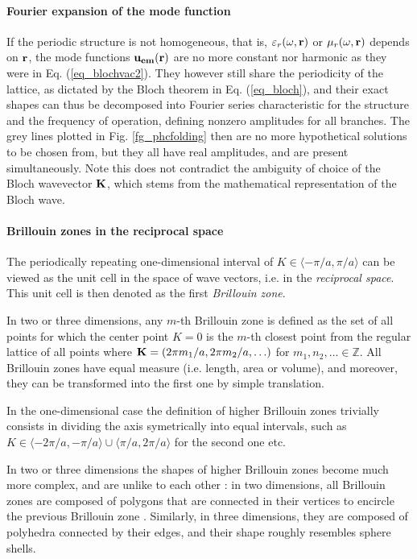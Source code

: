 \paragraph{Fourier expansion of the mode function}%
If the periodic structure is not homogeneous, that is, $\varepsilon_r(\omega,{\mathbf{r}})$ or $\mu_r(\omega,{\mathbf{r}})$ depends on ${\mathbf{r}}$, the mode functions $\mathbf{u_{em}}({\mathbf{r}})$ are no more constant nor harmonic as they were in Eq. (\ref{eq_blochvac2}). They however still share the periodicity of the lattice, as dictated by the Bloch theorem in Eq. (\ref{eq_bloch}), and their exact shapes can thus be decomposed into Fourier series
characteristic for the structure and the frequency of operation, defining nonzero amplitudes for all branches. The grey lines plotted in Fig. \ref{fg_phcfolding} then are no more hypothetical solutions to be chosen from, but they all have real amplitudes, and are present simultaneously. 
Note this does not contradict the ambiguity of choice of the Bloch wavevector ${\mathbf{K}}$, which stems from the  mathematical representation of the Bloch wave.

\paragraph{Brillouin zones in the reciprocal space} %

The periodically repeating one-dimensional interval of $K\in\langle-\pi/a, \pi/a\rangle$ can be viewed as the unit cell in the space of wave vectors, i.e. in the \textit{reciprocal space}. This unit cell is then denoted as the first \textit{Brillouin zone}. 

In two or three dimensions, any $m$-th Brillouin zone is defined as the set of all points for which the center point $K=0$ is the $m$-th closest point from the regular lattice of all points where ${\mathbf{K}} = (2\pi m_1/a, 2\pi m_2/a, \ldots)$ for $m_1, n_2, \ldots \in \mathbb{Z}$.
All Brillouin zones have equal measure (i.e. length, area or volume), and moreover, they can be transformed into the first one by simple translation. %

In the one-dimensional case the definition of higher Brillouin zones trivially consists in dividing the axis symetrically into equal intervals, such as $K\in\langle-2\pi/a, -\pi/a\rangle \cup \langle \pi/a, 2\pi/a\rangle$ for the second one etc. 

In two or three dimensions the shapes of higher Brillouin zones become much more complex, and are unlike to each other \cite[pp. 134--135]{klingshirn2007semiconductor}: in two dimensions, all Brillouin zones are composed of polygons that are connected in their vertices to encircle the previous Brillouin zone \cite[p. 126]{brillouin2003wave}. Similarly, in three dimensions, they are composed of polyhedra connected by their edges, and their shape roughly resembles sphere shells. 

